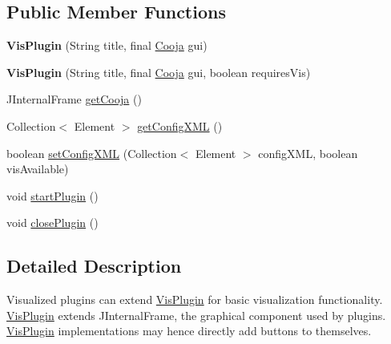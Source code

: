 \subsection*{Public Member Functions}
\begin{DoxyCompactItemize}
\item 
\hypertarget{classorg_1_1contikios_1_1cooja_1_1VisPlugin_a141a4f9ecee96ae38118d2285674c320}{{\bfseries Vis\-Plugin} (String title, final \hyperlink{classorg_1_1contikios_1_1cooja_1_1Cooja}{Cooja} gui)}\label{classorg_1_1contikios_1_1cooja_1_1VisPlugin_a141a4f9ecee96ae38118d2285674c320}

\item 
\hypertarget{classorg_1_1contikios_1_1cooja_1_1VisPlugin_aea37414f11100bcb1d265d71887b812b}{{\bfseries Vis\-Plugin} (String title, final \hyperlink{classorg_1_1contikios_1_1cooja_1_1Cooja}{Cooja} gui, boolean requires\-Vis)}\label{classorg_1_1contikios_1_1cooja_1_1VisPlugin_aea37414f11100bcb1d265d71887b812b}

\item 
J\-Internal\-Frame \hyperlink{classorg_1_1contikios_1_1cooja_1_1VisPlugin_a4c73dd97f27405a0804a2473d3e75e35}{get\-Cooja} ()
\item 
Collection$<$ Element $>$ \hyperlink{classorg_1_1contikios_1_1cooja_1_1VisPlugin_a2c15dd2d95364a708dde19b7b54fa974}{get\-Config\-X\-M\-L} ()
\item 
boolean \hyperlink{classorg_1_1contikios_1_1cooja_1_1VisPlugin_ad709d713ee9528c843400984ae183c6f}{set\-Config\-X\-M\-L} (Collection$<$ Element $>$ config\-X\-M\-L, boolean vis\-Available)
\item 
void \hyperlink{classorg_1_1contikios_1_1cooja_1_1VisPlugin_a34e1bee73bd2b86e39bb267f450e624f}{start\-Plugin} ()
\item 
void \hyperlink{classorg_1_1contikios_1_1cooja_1_1VisPlugin_ab010d744bcc4f590f7edd2e32e5f758d}{close\-Plugin} ()
\end{DoxyCompactItemize}


\subsection{Detailed Description}
Visualized plugins can extend \hyperlink{classorg_1_1contikios_1_1cooja_1_1VisPlugin}{Vis\-Plugin} for basic visualization functionality. \hyperlink{classorg_1_1contikios_1_1cooja_1_1VisPlugin}{Vis\-Plugin} extends J\-Internal\-Frame, the graphical component used by plugins. \hyperlink{classorg_1_1contikios_1_1cooja_1_1VisPlugin}{Vis\-Plugin} implementations may hence directly add buttons to themselves.

